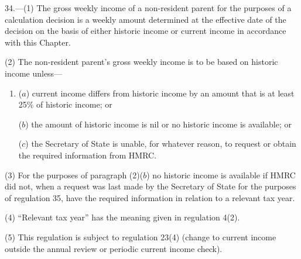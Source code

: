 \documentclass[12pt,a4paper]{article}
\begin{document}
34.---(1)  The gross weekly income of a non-resident parent for the purposes of a calculation decision is a weekly amount determined at the effective date of the decision on the basis of either historic income or current income in accordance with this Chapter.

(2) The non-resident parent’s gross weekly income is to be based on historic income unless—
\begin{enumerate}\item[]
($a$) current income differs from historic income by an amount that is at least 25\% of historic income; or

($b$) 
the amount of historic income is nil or  %
no historic income is available;
%
or

($c$) the Secretary of State is unable, for whatever reason, to request or obtain the required information from HMRC.
\end{enumerate}

%

(3) For the purposes of paragraph (2)($b$)  no historic income is available if HMRC did not, when a request was last made by the Secretary of State for the purposes of regulation 35, have the required information in relation to a relevant tax year.

(4) “Relevant tax year” has the meaning given in regulation 4(2).

(5) This regulation is subject to regulation 23(4) (change to current income outside the annual review or periodic current income check).

\end{document}
